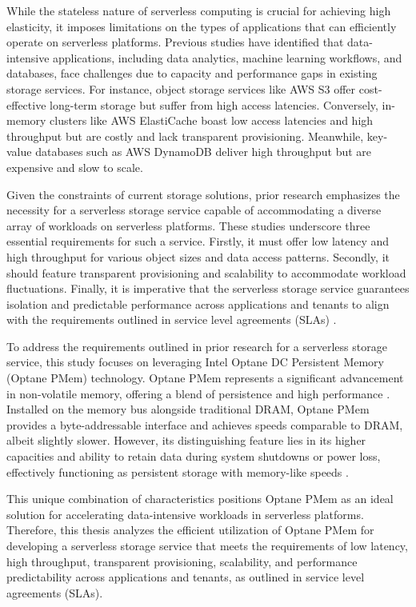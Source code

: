 While the stateless nature of serverless computing is crucial for achieving high elasticity, it imposes limitations on the types of applications that can efficiently operate on serverless platforms. Previous studies \cite{jonas2019cloud,pu2019shuffling,gan2019opensource} have identified that data-intensive applications, including data analytics, machine learning workflows, and databases, face challenges due to capacity and performance gaps in existing storage services. For instance, object storage services like AWS S3 offer cost-effective long-term storage but suffer from high access latencies. Conversely, in-memory clusters like AWS ElastiCache boast low access latencies and high throughput but are costly and lack transparent provisioning. Meanwhile, key-value databases such as AWS DynamoDB deliver high throughput but are expensive and slow to scale.

Given the constraints of current storage solutions, prior research emphasizes the necessity for a serverless storage service capable of accommodating a diverse array of workloads on serverless platforms. These studies underscore three essential requirements for such a service. Firstly, it must offer low latency and high throughput for various object sizes and data access patterns. Secondly, it should feature transparent provisioning and scalability to accommodate workload fluctuations. Finally, it is imperative that the serverless storage service guarantees isolation and predictable performance across applications and tenants to align with the requirements outlined in service level agreements (SLAs) \cite{jonas2019cloud,klimovic2018pocket}.

To address the requirements outlined in prior research for a serverless storage service, this study focuses on leveraging Intel Optane DC Persistent Memory (Optane PMem) technology. Optane PMem represents a significant advancement in non-volatile memory, offering a blend of persistence and high performance \cite{IntelOp15:online}. Installed on the memory bus alongside traditional DRAM, Optane PMem provides a byte-addressable interface and achieves speeds comparable to DRAM, albeit slightly slower. However, its distinguishing feature lies in its higher capacities and ability to retain data during system shutdowns or power loss, effectively functioning as persistent storage with memory-like speeds \cite{yang2020empirical,izraelevitz2019basic}.

This unique combination of characteristics positions Optane PMem as an ideal solution for accelerating data-intensive workloads in serverless platforms. Therefore, this thesis analyzes the efficient utilization of Optane PMem for developing a serverless storage service that meets the requirements of low latency, high throughput, transparent provisioning, scalability, and performance predictability across applications and tenants, as outlined in service level agreements (SLAs).


